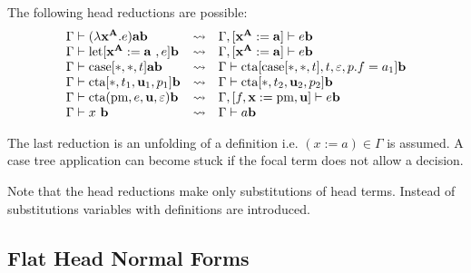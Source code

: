 The following head reductions are possible:
$$
\begin{array}{llll}
        \Gamma \vdash (\lambda \vec x^{\vec A}. e) \vec a \vec b
        &\reduce&
        \Gamma, [\vec x^{\vec A} := \vec a] \vdash e \vec b
        \\
        \Gamma \vdash \llet[\vec x^{\vec A} := \vec a , e] \vec b
        &\reduce&
        \Gamma, [\vec x^{\vec A} := \vec a] \vdash e \vec b
        \\
        \Gamma \vdash \case[*, *, t] \vec a \vec b
        &\reduce&
        \Gamma \vdash \cta[\case[*,*,t], t, \empty, p.f = a_1] \vec b
        \\
        \Gamma \vdash \cta[*, t_1, \vec u_1, p_1] \vec b
        &\reduce&
        \Gamma \vdash \cta[*, t_2, \vec u_2, p_2] \vec b
        \\
        \Gamma
        \vdash
        \cta(\text{pm}, e, \vec u, \empty) \vec b
        &\reduce&
        \Gamma, [f,\vec x := \text{pm}, \vec u]
        \vdash
        e \vec b
        \\
        \Gamma \vdash x \vec b
        &\reduce&
        \Gamma \vdash a \vec b
\end{array}
$$

The last reduction is an unfolding of a definition i.e. $(x:=a) \in \Gamma$ is
assumed. A case tree application can become stuck if the focal term does not
allow a decision.

Note that the head reductions make only substitutions of head terms. Instead of
substitutions variables with definitions are introduced.




\subsection{Flat Head Normal Forms}



